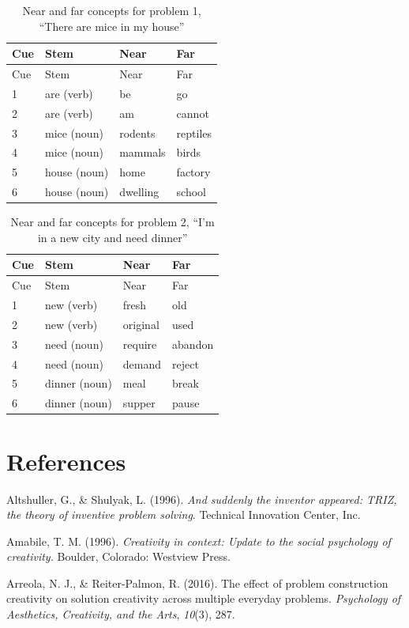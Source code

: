 \documentclass[english,man]{apa6}
\begin{document}
\newpage

\begin{longtable}[]{@{}llll@{}}
\caption{Near and far concepts for problem 1, \enquote{There are mice in
my house}}\tabularnewline
\toprule
Cue & Stem & Near & Far\tabularnewline
\midrule
\endfirsthead
\toprule
Cue & Stem & Near & Far\tabularnewline
\midrule
\endhead
1 & are (verb) & be & go\tabularnewline
2 & are (verb) & am & cannot\tabularnewline
3 & mice (noun) & rodents & reptiles\tabularnewline
4 & mice (noun) & mammals & birds\tabularnewline
5 & house (noun) & home & factory\tabularnewline
6 & house (noun) & dwelling & school\tabularnewline
\bottomrule
\end{longtable}

\begin{longtable}[]{@{}llll@{}}
\caption{Near and far concepts for problem 2, \enquote{I'm in a new city
and need dinner}}\tabularnewline
\toprule
Cue & Stem & Near & Far\tabularnewline
\midrule
\endfirsthead
\toprule
Cue & Stem & Near & Far\tabularnewline
\midrule
\endhead
1 & new (verb) & fresh & old\tabularnewline
2 & new (verb) & original & used\tabularnewline
3 & need (noun) & require & abandon\tabularnewline
4 & need (noun) & demand & reject\tabularnewline
5 & dinner (noun) & meal & break\tabularnewline
6 & dinner (noun) & supper & pause\tabularnewline
\bottomrule
\end{longtable}

\newpage

\hypertarget{references}{%
\section{References}\label{references}}

\setlength{\parindent}{-0.5in}
\setlength{\leftskip}{0.5in}
\setlength{\parskip}{8pt}

\hypertarget{refs}{}
\leavevmode\hypertarget{ref-altshuller1996and}{}%
Altshuller, G., \& Shulyak, L. (1996). \emph{And suddenly the inventor
appeared: TRIZ, the theory of inventive problem solving}. Technical
Innovation Center, Inc.

\leavevmode\hypertarget{ref-amabile_creativity_1996}{}%
Amabile, T. M. (1996). \emph{Creativity in context: Update to the social
psychology of creativity.} Boulder, Colorado: Westview Press.

\leavevmode\hypertarget{ref-arreola2016effect}{}%
Arreola, N. J., \& Reiter-Palmon, R. (2016). The effect of problem
construction creativity on solution creativity across multiple everyday
problems. \emph{Psychology of Aesthetics, Creativity, and the Arts},
\emph{10}(3), 287.
\end{document}
